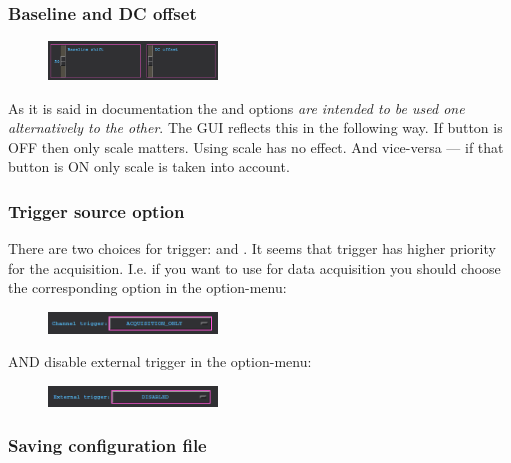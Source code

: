 \subsubsection*{Baseline and DC offset}
\begin{figure}[H]
    \centering
    \includegraphics[width=0.4\textwidth]{../pictures/documentation/gui/baseline.png}
\end{figure}
As it is said in  documentation the  and
 options \emph{are intended to be used one alternatively to the other}.
The GUI reflects this in the following way. If   button is OFF then only  scale matters. Using
 scale has no effect. And vice-versa --- if that button is ON only
 scale is taken into account.

\subsubsection*{Trigger source option}
There are two choices for trigger:  and . It seems that
 trigger has higher priority for the acquisition. I.e. if you want to
use  for data acquisition you should choose the corresponding option
in the  option-menu:
\begin{figure}[H]
    \centering
    \includegraphics[width=0.4\textwidth]{../pictures/documentation/gui/chan.png}
\end{figure}
\noindent AND disable external trigger in the  option-menu:
\begin{figure}[H]
    \centering
    \includegraphics[width=0.4\textwidth]{../pictures/documentation/gui/ext.png}
\end{figure}

\subsubsection*{Saving configuration file} 

